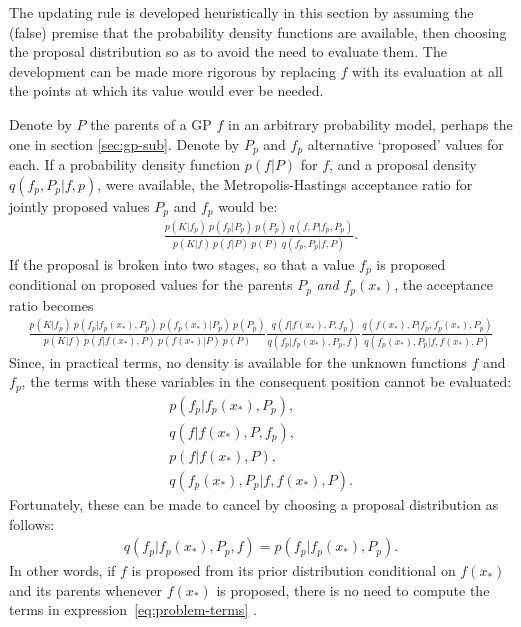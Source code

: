 \documentclass[article]{jss}
\begin{document}
The updating rule is developed heuristically in this section by assuming the (false) premise that the probability density functions are available, then choosing the proposal distribution so as to avoid the need to evaluate them. The development can be made more rigorous by replacing $f$ with its evaluation at all the points at which its value would ever be needed.

Denote by $P$ the parents of a GP $f$ in an arbitrary probability model, perhaps the one in section \ref{sec:gp-sub}. Denote by $P_p$ and $f_p$ alternative `proposed' values for each. If a probability density function $p(f|P)$ for $f$, and a proposal density $q(f_p,P_p|f,p)$, were available, the Metropolis-Hastings acceptance ratio for jointly proposed values $P_p$ and $f_p$ would be:
\begin{eqnarray*}
    \frac{p(K|f_p)\ p(f_p|P_p)\ p(P_p)\ q(f,P|f_p,P_p)}{p(K|f)\ p(f|P)\ p(P)\ q(f_p,P_p|f,P)}.
\end{eqnarray*}
If the proposal is broken into two stages, so that a value $f_p$ is proposed conditional on proposed values for the parents $P_p$ \emph{and} $f_p(x_*)$, the acceptance ratio becomes
\begin{eqnarray*}
    \frac{p(K|f_p)\ p(f_p|f_p(x_*), P_p)\ p(f_p(x_*) | P_p)\ p(P_p)}{p(K|f)\ p(f|f(x_*), P)\ p(f(x_*) | P)\ p(P)}
    \frac{q(f|f(x_*),P,f_p)  }{q(f_p|f_p(x_*),P_p,f)}
    \frac{q(f(x_*),P|f_p,f_p(x_*),P_p)}{q(f_p(x_*),P_p|f,f(x_*), P)}
\end{eqnarray*}
Since, in practical terms, no density is available for the unknown functions $f$ and $f_p$, the terms with these variables in the consequent position cannot be evaluated:
\begin{equation}
    \label{eq:problem-terms} 
    \begin{array}{r}
        p(f_p|f_p(x_*), P_p),\\ q(f|f(x_*),P,f_p),\\ p(f|f(x_*), P),\\ q(f_p(x_*),P_p|f,f(x_*), P).
    \end{array}
\end{equation}
Fortunately, these can be made to cancel by choosing a proposal distribution as follows:
\begin{eqnarray*}
    q(f_p|f_p(x_*),P_p,f) = p(f_p|f_p(x_*), P_p).
\end{eqnarray*}
In other words, if $f$ is proposed from its prior distribution conditional on $f(x_*)$ and its parents whenever $f(x_*)$ is proposed, there is no need to compute the terms in expression~\ref{eq:problem-terms} .
\end{document}
